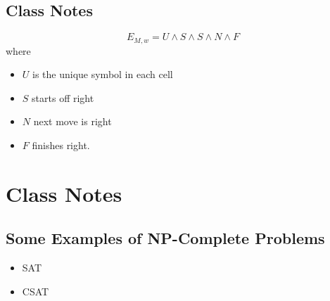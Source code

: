 \documentclass[]{article}
\begin{document}
\subsection*{Class Notes}
\[E_{M,w} = U \wedge S \wedge S \wedge N \wedge F \]
where
\begin{itemize}
\item $U$ is the unique symbol in each cell
\item $S$ starts off right
\item $N$ next move is right
\item $F$ finishes right.
\end{itemize}

\section*{Class Notes}
\subsection*{Some Examples of NP-Complete Problems}
\begin{itemize}
\item SAT
\item CSAT
\end{itemize}
\end{document}
